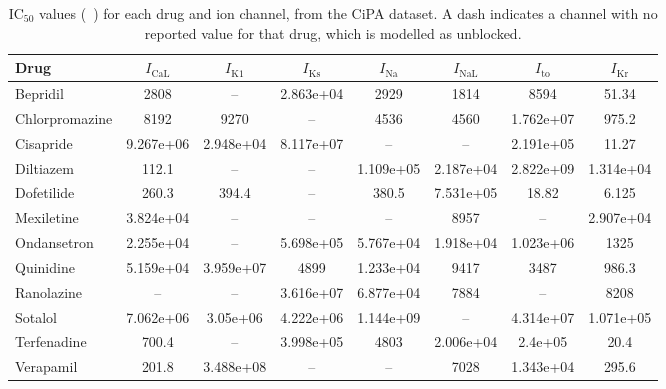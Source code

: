 \begin{table}[t]
\centering
\caption{$\mathrm{IC}_{50}$ values (\si{\nano\molar}) for each drug and ion channel, from the CiPA dataset. A dash indicates a channel with no reported value for that drug, which is modelled as unblocked.}
\label{tab:supp-ic50}
\footnotesize
\begin{tabular}{l S S S S S S S}
\toprule
\textbf{Drug} & {$I_{\mathrm{CaL}}$} & {$I_{\mathrm{K1}}$} & {$I_{\mathrm{Ks}}$} & {$I_{\mathrm{Na}}$} & {$I_{\mathrm{NaL}}$} & {$I_{\mathrm{to}}$} & {$I_{\mathrm{Kr}}$} \\
\midrule
Bepridil & 2808 & {--} & 2.863e+04 & 2929 & 1814 & 8594 & 51.34 \\
Chlorpromazine & 8192 & 9270 & {--} & 4536 & 4560 & 1.762e+07 & 975.2 \\
Cisapride & 9.267e+06 & 2.948e+04 & 8.117e+07 & {--} & {--} & 2.191e+05 & 11.27 \\
Diltiazem & 112.1 & {--} & {--} & 1.109e+05 & 2.187e+04 & 2.822e+09 & 1.314e+04 \\
Dofetilide & 260.3 & 394.4 & {--} & 380.5 & 7.531e+05 & 18.82 & 6.125 \\
Mexiletine & 3.824e+04 & {--} & {--} & {--} & 8957 & {--} & 2.907e+04 \\
Ondansetron & 2.255e+04 & {--} & 5.698e+05 & 5.767e+04 & 1.918e+04 & 1.023e+06 & 1325 \\
Quinidine & 5.159e+04 & 3.959e+07 & 4899 & 1.233e+04 & 9417 & 3487 & 986.3 \\
Ranolazine & {--} & {--} & 3.616e+07 & 6.877e+04 & 7884 & {--} & 8208 \\
Sotalol & 7.062e+06 & 3.05e+06 & 4.222e+06 & 1.144e+09 & {--} & 4.314e+07 & 1.071e+05 \\
Terfenadine & 700.4 & {--} & 3.998e+05 & 4803 & 2.006e+04 & 2.4e+05 & 20.4 \\
Verapamil & 201.8 & 3.488e+08 & {--} & {--} & 7028 & 1.343e+04 & 295.6 \\
\bottomrule
\end{tabular}
\end{table}

